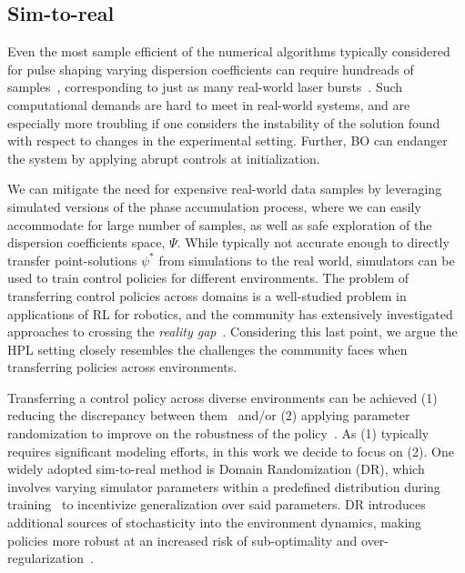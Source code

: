 \subsection{Sim-to-real}
Even the most sample efficient of the numerical algorithms typically considered for pulse shaping varying dispersion coefficients can require hundreads of samples~\citep{capuano2022laser}, corresponding to just as many real-world laser bursts~\citep{shalloo2020automation}. Such computational demands are hard to meet in real-world systems, and are especially more troubling if one considers the instability of the solution found with respect to changes in the experimental setting. Further, BO can endanger the system by applying abrupt controls at initialization.

We can mitigate the need for expensive real-world data samples by leveraging simulated versions of the phase accumulation process, where we can easily accommodate for large number of samples, as well as safe exploration of the dispersion coefficients space, \( \Psi \). While typically not accurate enough to directly transfer point-solutions \( \psi^* \) from simulations to the real world, simulators can be used to train control policies for different environments. The problem of transferring control policies across domains is a well-studied problem in applications of RL for robotics, and the community has extensively investigated approaches to crossing the \emph{reality gap}~\citep{tobin2017domain, valassakis2020crossing}. Considering this last point, we argue the HPL setting closely resembles the challenges the community faces when transferring policies across environments. 

Transferring a control policy across diverse environments can be achieved (1) reducing the discrepancy between them~\citep{zhu2017fast} and/or (2) applying parameter randomization to improve on the robustness of the policy~\citep{peng2018sim}.
As (1) typically requires significant modeling efforts, in this work we decide to focus on (2).
One widely adopted sim-to-real method is Domain Randomization (DR), which involves varying simulator parameters within a predefined distribution during training~\citep{valassakis2020crossing} to incentivize generalization over said parameters. DR introduces additional sources of stochasticity into the environment dynamics, making policies more robust at an increased risk of sub-optimality and over-regularization~\citep{margolis2024rapid}.

